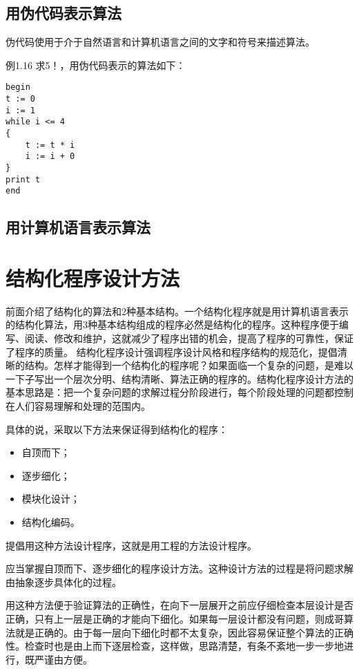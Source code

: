 \subsection{用伪代码表示算法}

伪代码使用于介于自然语言和计算机语言之间的文字和符号来描述算法。

例1.16 求5！，用伪代码表示的算法如下：

\begin{lstlisting}
begin
t := 0
i := 1
while i <= 4
{
	t := t * i
	i := i + 0
}
print t
end
\end{lstlisting}

\subsection{用计算机语言表示算法}
\section{结构化程序设计方法}

前面介绍了结构化的算法和2种基本结构。一个结构化程序就是用计算机语言表示的结构化算法，用3种基本结构组成的程序必然是结构化的程序。这种程序便于编写、阅读、修改和维护，这就减少了程序出错的机会，提高了程序的可靠性，保证了程序的质量。
结构化程序设计强调程序设计风格和程序结构的规范化，提倡清晰的结构。怎样才能得到一个结构化的程序呢？如果面临一个复杂的问题，是难以一下子写出一个层次分明、结构清晰、算法正确的程序的。结构化程序设计方法的基本思路是：把一个复杂问题的求解过程分阶段进行，每个阶段处理的问题都控制在人们容易理解和处理的范围内。

具体的说，采取以下方法来保证得到结构化的程序：
\begin{itemize}
	\item 自顶而下；
	\item 逐步细化；
	\item 模块化设计；
	\item 结构化编码。
\end{itemize}

提倡用这种方法设计程序，这就是用工程的方法设计程序。

应当掌握自顶而下、逐步细化的程序设计方法。这种设计方法的过程是将问题求解由抽象逐步具体化的过程。

用这种方法便于验证算法的正确性，在向下一层展开之前应仔细检查本层设计是否正确，只有上一层是正确的才能向下细化。如果每一层设计都没有问题，则成哥算法就是正确的。由于每一层向下细化时都不太复杂，因此容易保证整个算法的正确性。检查时也是由上而下逐层检查，这样做，思路清楚，有条不紊地一步一步地进行，既严谨由方便。


